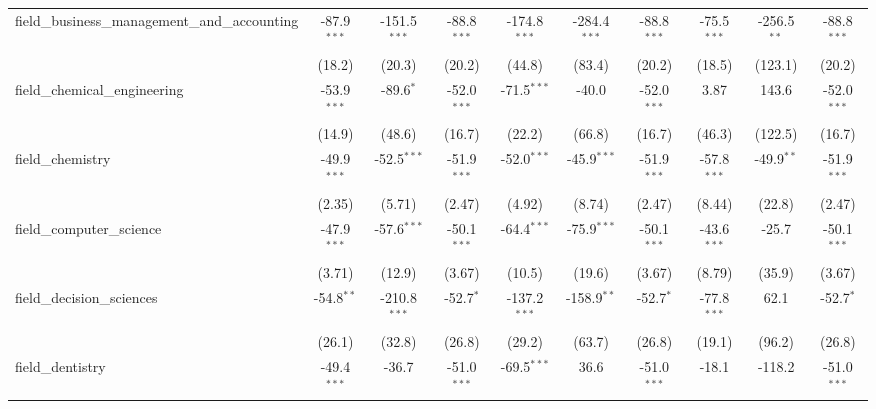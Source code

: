 \begin{tabular}{lccccccccc}
   field\_business\_management\_and\_accounting                & -87.9$^{***}$ & -151.5$^{***}$ & -88.8$^{***}$ & -174.8$^{***}$ & -284.4$^{***}$ & -88.8$^{***}$ & -75.5$^{***}$  & -256.5$^{**}$  & -88.8$^{***}$\\   
                                                               & (18.2)        & (20.3)         & (20.2)        & (44.8)         & (83.4)         & (20.2)        & (18.5)         & (123.1)        & (20.2)\\   
   field\_chemical\_engineering                                & -53.9$^{***}$ & -89.6$^{*}$    & -52.0$^{***}$ & -71.5$^{***}$  & -40.0          & -52.0$^{***}$ & 3.87           & 143.6          & -52.0$^{***}$\\   
                                                               & (14.9)        & (48.6)         & (16.7)        & (22.2)         & (66.8)         & (16.7)        & (46.3)         & (122.5)        & (16.7)\\   
   field\_chemistry                                            & -49.9$^{***}$ & -52.5$^{***}$  & -51.9$^{***}$ & -52.0$^{***}$  & -45.9$^{***}$  & -51.9$^{***}$ & -57.8$^{***}$  & -49.9$^{**}$   & -51.9$^{***}$\\   
                                                               & (2.35)        & (5.71)         & (2.47)        & (4.92)         & (8.74)         & (2.47)        & (8.44)         & (22.8)         & (2.47)\\   
   field\_computer\_science                                    & -47.9$^{***}$ & -57.6$^{***}$  & -50.1$^{***}$ & -64.4$^{***}$  & -75.9$^{***}$  & -50.1$^{***}$ & -43.6$^{***}$  & -25.7          & -50.1$^{***}$\\   
                                                               & (3.71)        & (12.9)         & (3.67)        & (10.5)         & (19.6)         & (3.67)        & (8.79)         & (35.9)         & (3.67)\\   
   field\_decision\_sciences                                   & -54.8$^{**}$  & -210.8$^{***}$ & -52.7$^{*}$   & -137.2$^{***}$ & -158.9$^{**}$  & -52.7$^{*}$   & -77.8$^{***}$  & 62.1           & -52.7$^{*}$\\   
                                                               & (26.1)        & (32.8)         & (26.8)        & (29.2)         & (63.7)         & (26.8)        & (19.1)         & (96.2)         & (26.8)\\   
   field\_dentistry                                            & -49.4$^{***}$ & -36.7          & -51.0$^{***}$ & -69.5$^{***}$  & 36.6           & -51.0$^{***}$ & -18.1          & -118.2         & -51.0$^{***}$\\   

\end{tabular}
